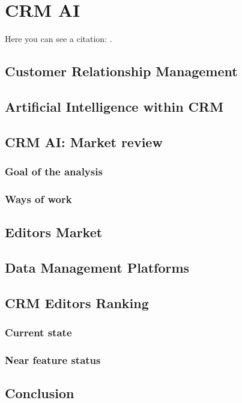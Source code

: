 \chapter{CRM AI}

Here you can see a citation: \cite{wiki}.


\section{Customer Relationship Management}
\lipsum[1]


\section{Artificial Intelligence within CRM}
\lipsum[1]


\section{CRM AI: Market review}
\lipsum[1]

\subsection{Goal of the analysis}
\lipsum[2]

\subsection{Ways of work}
\lipsum[3]

\section{Editors Market}
\lipsum[1]

\section{Data Management Platforms}
\lipsum[1]


\section{CRM Editors Ranking}
\lipsum[1]

\subsection{Current state}
\lipsum[2]

\subsection{Near feature status}
\lipsum[3]

\section{Conclusion}
\lipsum[1]
